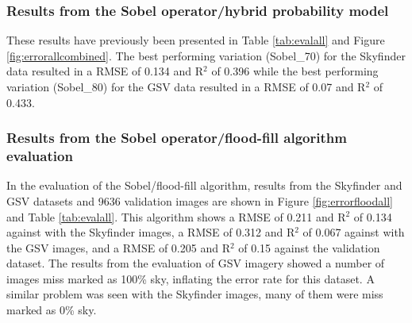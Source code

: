 \documentclass[final,3p,times,authoryear]{elsarticle}
\begin{document}
\subsubsection{Results from the \cite{Wang2015a} Sobel operator/hybrid probability model}
These results have previously been presented in Table \ref{tab:evalall} and Figure \ref{fig:errorallcombined}. The best performing variation (Sobel\_70) for the Skyfinder data resulted in a RMSE of 0.134 and R$^{2}$ of 0.396 while the best performing variation (Sobel\_80) for the GSV data resulted in a RMSE of 0.07 and R$^{2}$ of 0.433.

\subsubsection{Results from the \cite{Middel2018} Sobel operator/flood-fill algorithm evaluation}\label{sec:resultsflood}
In the evaluation of the Sobel/flood-fill algorithm, results from the Skyfinder and GSV datasets and 9636 validation images are shown in Figure \ref{fig:errorfloodall} and Table \ref{tab:evalall}. This algorithm shows a RMSE of 0.211 and R$^{2}$ of 0.134 against with the Skyfinder images, a RMSE of 0.312 and R$^{2}$ of 0.067 against with the GSV images, and a RMSE of 0.205 and R$^{2}$ of 0.15 against the validation dataset. The results from the evaluation of GSV imagery showed a number of images miss marked as 100\% sky, inflating the error rate for this dataset. A similar problem was seen with the Skyfinder images, many of them were miss marked as 0\% sky.
\end{document}
